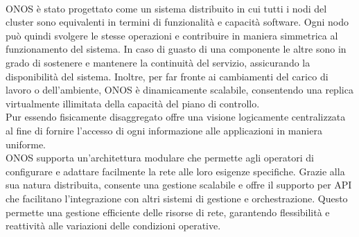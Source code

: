\\ONOS è stato progettato come un sistema distribuito in cui tutti i nodi del cluster sono equivalenti in termini di funzionalità e capacità software.
Ogni nodo può quindi svolgere le stesse operazioni e contribuire in maniera simmetrica al funzionamento del sistema.
In caso di guasto di una componente le altre sono in grado di sostenere e mantenere la continuità del servizio, assicurando la disponibilità del sistema. Inoltre, per far fronte ai cambiamenti del carico di lavoro o dell'ambiente, ONOS è dinamicamente scalabile, 
consentendo una replica virtualmente illimitata della capacità del piano di controllo.
\\Pur essendo fisicamente disaggregato offre una visione logicamente centralizzata al fine di fornire l'accesso di ogni informazione alle applicazioni in maniera uniforme.
\\ONOS supporta un'architettura modulare che permette agli operatori di configurare e adattare facilmente la rete alle loro esigenze specifiche.
Grazie alla sua natura distribuita, consente una gestione scalabile e offre il supporto per API che facilitano l'integrazione con altri sistemi di gestione e orchestrazione.
Questo permette una gestione efficiente delle risorse di rete, garantendo flessibilità e reattività alle variazioni delle condizioni operative.



